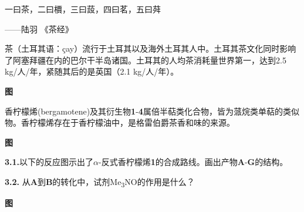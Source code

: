 一曰茶，二曰檟，三曰蔎，四曰茗，五曰荈

\begin{flushright}
------陆羽 《茶经》
\end{flushright}

茶（土耳其语：çay）流行于土耳其以及海外土耳其人中。土耳其茶文化同时影响了阿塞拜疆在内的巴尔干半岛诸国。土耳其的人均茶消耗量世界第一，达到2.5
kg/人/年，紧随其后的是英国（2.1 kg/人/年）。

\textbf{图}

香柠檬烯(bergamotene)及其衍生物\textbf{1}-\textbf{4}属倍半萜类化合物，皆为蒎烷类单萜的类似物。香柠檬烯存在于香柠檬油中，是格雷伯爵茶香和味的来源。

\textbf{图}

\noindent\textbf{3.1.}以下的反应图示出了$\alpha$-反式香柠檬烯\textbf{1}的合成路线。画出产物\textbf{A}-\textbf{G}的结构。

\noindent\textbf{3.2.} 从\textbf{A}到\textbf{B}的转化中，试剂Me\textsubscript{3}NO的作用是什么？

\textbf{图}
